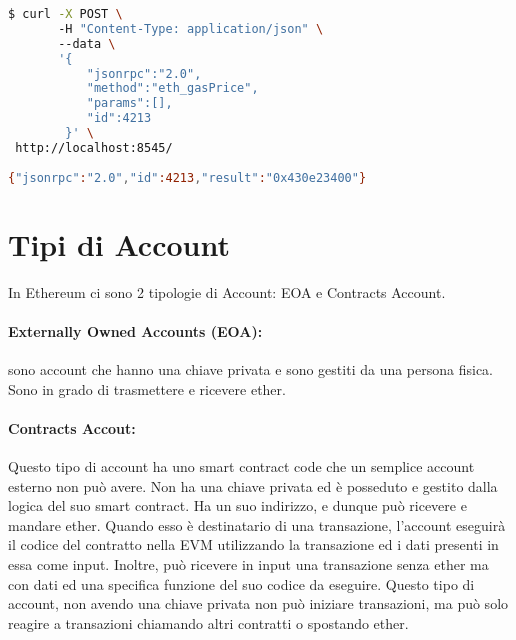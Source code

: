 \begin{lstlisting}[language=Bash, caption=Esempio di richiesta tramite jsonrpc]
$ curl -X POST \ 
       -H "Content-Type: application/json" \  
       --data \
       '{
           "jsonrpc":"2.0",
           "method":"eth_gasPrice",
           "params":[],
           "id":4213
        }' \
 http://localhost:8545/
 
{"jsonrpc":"2.0","id":4213,"result":"0x430e23400"}
\end{lstlisting}

\section{Tipi di Account}

In Ethereum ci sono 2 tipologie di Account: EOA e Contracts Account.

\paragraph{Externally Owned Accounts (EOA):}
sono account che hanno una chiave privata e sono gestiti da una persona fisica.
Sono in grado di trasmettere e ricevere ether.

\paragraph{Contracts Accout:}
Questo tipo di account ha uno smart contract code che un semplice account esterno non può avere.
Non ha una chiave privata ed è posseduto e gestito dalla logica del suo smart contract.
Ha un suo indirizzo, e dunque può ricevere e mandare ether.
Quando esso è destinatario di una transazione, l'account eseguirà il codice del contratto
nella EVM utilizzando la transazione ed i dati presenti in essa come input.
Inoltre, può ricevere in input una transazione senza ether ma con dati ed una specifica
funzione del suo codice da eseguire. Questo tipo di account, non avendo una chiave privata
non può iniziare transazioni, ma può solo reagire a transazioni chiamando altri contratti o
spostando ether.

\vspace{-2em}

